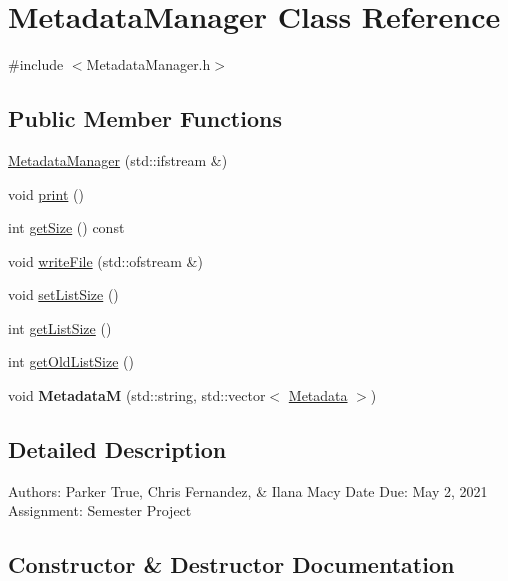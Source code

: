 \hypertarget{classMetadataManager}{}\section{Metadata\+Manager Class Reference}
\label{classMetadataManager}


{\ttfamily \#include $<$Metadata\+Manager.\+h$>$}

\subsection*{Public Member Functions}
\begin{DoxyCompactItemize}
\item 
\hyperlink{classMetadataManager_ae78ad769dbe26e0e2cbab6548f7b6830}{Metadata\+Manager} (std\+::ifstream \&)
\item 
void \hyperlink{classMetadataManager_a4eb5b8e9539b2e158cacdd1bca2cacd9}{print} ()
\item 
int \hyperlink{classMetadataManager_a497d7031313fd7c43b11228145e927c2}{get\+Size} () const
\item 
void \hyperlink{classMetadataManager_ab67fbd206d6baa6e8c7e623564ca5f29}{write\+File} (std\+::ofstream \&)
\item 
void \hyperlink{classMetadataManager_a0a5a92ad2a37e118273df2ba15de802c}{set\+List\+Size} ()
\item 
int \hyperlink{classMetadataManager_af1bbbc6018d54c4ec84e02829da27b99}{get\+List\+Size} ()
\item 
int \hyperlink{classMetadataManager_a5a98daedda8a707f14a39457bdd34354}{get\+Old\+List\+Size} ()
\item 
\mbox{\label{classMetadataManager_af2a6b59f95e0d6ac70b3424f0ec78e1c}} 
void {\bfseries MetadataM} (std\+::string, std\+::vector$<$ \hyperlink{classMetadata}{Metadata} $>$)
\end{DoxyCompactItemize}


\subsection{Detailed Description}
Authors\+: Parker True, Chris Fernandez, \& Ilana Macy Date Due\+: May 2, 2021 Assignment\+: Semester Project 

\subsection{Constructor \& Destructor Documentation}
\mbox{\label{classMetadataManager_ae78ad769dbe26e0e2cbab6548f7b6830}} 
